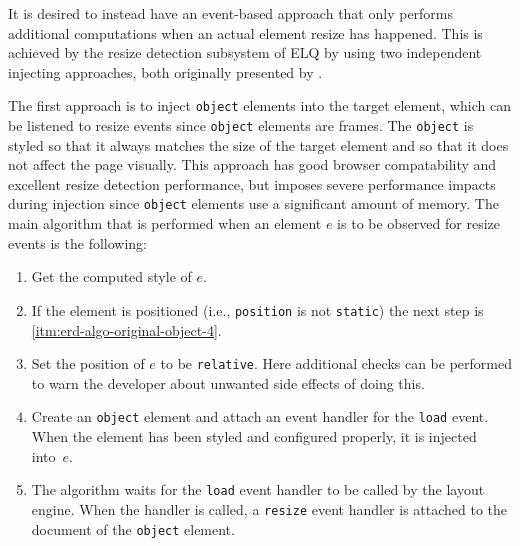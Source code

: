 \documentclass{acm_proc_article-sp}
\newcommand{\code}[1]{\texttt{#1}}
\newcommand{\elq}{ELQ}
\newcommand{\gls}[1]{#1}
\begin{document}


    It is desired to instead have an event-based approach that only performs additional computations when an actual element resize has happened.
    This is achieved by the resize detection subsystem of \elq{} by using two independent injecting approaches, both originally presented by \cite{backalley}.

    The first approach is to inject \code{object} elements into the target element, which can be listened to resize events since \code{object} elements are frames.
    The \code{object} is styled so that it always matches the size of the target \gls{element} and so that it does not affect the page visually.
    This approach has good browser compatability and excellent resize detection performance, but imposes severe performance impacts during injection since \code{object} elements use a significant amount of memory.
    The main algorithm that is performed when an element $e$ is to be observed for resize events is the following:
    \begin{enumerate}
      \item\label{itm:erd-algo-original-object-1} Get the computed style of $e$.
      \item                                       If the element is positioned (i.e., \code{position} is not \code{static}) the next step is \ref{itm:erd-algo-original-object-4}.
      \item\label{itm:erd-algo-original-object-3} Set the position of $e$ to be \code{relative}. Here additional checks can be performed to warn the developer about unwanted side effects of doing this.
      \item\label{itm:erd-algo-original-object-4} Create an \code{object} element and attach an event handler for the \code{load} event. When the element has been styled and configured properly, it is injected into~$e$.
      \item                                       The algorithm waits for the \code{load} event handler to be called by the \gls{layout engine}. When the handler is called, a \code{resize} event handler is attached to the \gls{document} of the \code{object} \gls{element}.
    \end{enumerate}
\end{document}
